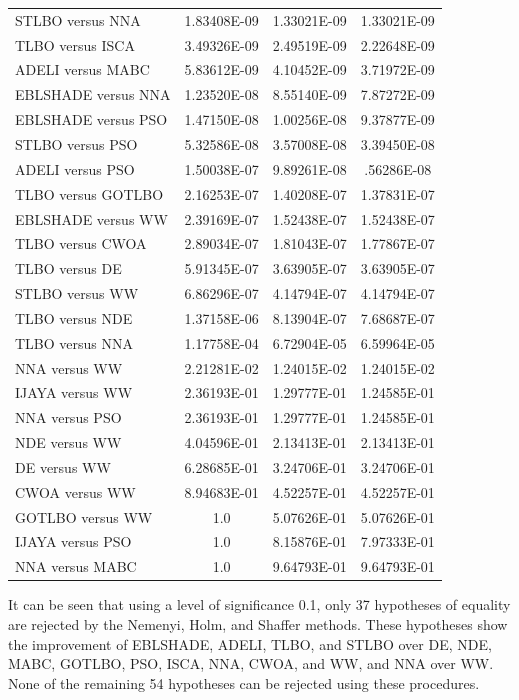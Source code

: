 \documentclass[a4paper,fleqn]{cas-dc}
\begin{document}
\begin{table}[<options>]
\begin{tabular*}{\tblwidth}{@{}LCCC@{}}
STLBO versus NNA&1.83408E-09&1.33021E-09&1.33021E-09\\
TLBO versus ISCA&3.49326E-09&2.49519E-09&2.22648E-09\\
ADELI versus MABC&5.83612E-09&4.10452E-09&3.71972E-09\\
EBLSHADE versus NNA&1.23520E-08&8.55140E-09&7.87272E-09\\
EBLSHADE versus PSO&1.47150E-08&1.00256E-08&9.37877E-09\\
STLBO versus PSO&5.32586E-08&3.57008E-08&3.39450E-08\\
ADELI versus PSO&1.50038E-07&9.89261E-08&.56286E-08\\
TLBO versus GOTLBO&2.16253E-07&1.40208E-07&1.37831E-07\\
EBLSHADE versus WW&2.39169E-07&1.52438E-07&1.52438E-07\\
TLBO versus CWOA&2.89034E-07&1.81043E-07&1.77867E-07\\
TLBO versus DE&5.91345E-07&3.63905E-07&3.63905E-07\\
STLBO versus WW&6.86296E-07&4.14794E-07&4.14794E-07\\
TLBO versus NDE&1.37158E-06&8.13904E-07&7.68687E-07\\
TLBO versus NNA&1.17758E-04&6.72904E-05&6.59964E-05\\
NNA versus WW&2.21281E-02&1.24015E-02&1.24015E-02\\
IJAYA versus WW&2.36193E-01&1.29777E-01&1.24585E-01\\
NNA versus PSO&2.36193E-01&1.29777E-01&1.24585E-01\\
NDE versus WW&4.04596E-01&2.13413E-01&2.13413E-01\\
DE versus WW&6.28685E-01&3.24706E-01&3.24706E-01\\
CWOA versus WW&8.94683E-01&4.52257E-01&4.52257E-01\\
GOTLBO versus WW&1.0&5.07626E-01&5.07626E-01\\
IJAYA versus PSO&1.0&8.15876E-01&7.97333E-01\\
NNA versus MABC&1.0&9.64793E-01&9.64793E-01\\
\bottomrule
\end{tabular*}
\end{table}


It can be seen that using a level of significance 0.1, only 37 hypotheses of equality
are rejected by the Nemenyi, Holm, and Shaffer methods.
These hypotheses show the improvement of EBLSHADE, ADELI,  TLBO, and STLBO
over DE, NDE, MABC, GOTLBO, PSO, ISCA, NNA, CWOA, and WW,
and NNA over WW.
None of the remaining 54 hypotheses can be rejected using these procedures.
\end{document}
